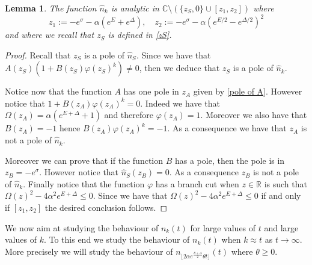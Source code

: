 \documentclass{article}
\numberwithin{equation}{section}
\theoremstyle{plain}
\newtheorem{lemma}[theorem]{Lemma}
\begin{document}
\begin{lemma}
    The function $\hat{n}_k$ is analytic in $\mathbb C \setminus \left(  \{ z_S, 0  \} \cup [z_1, z_2 ] \right) $ where
    \begin{equation} \label{z_1 and z_2}
        z_1 := - e^\sigma - \alpha ( e^E + e^\Delta ), \quad  z_2:=  - e^\sigma - \alpha ( e^{E/2} - e^{\Delta/2} )^2
    \end{equation}
    and where we recall that $z_S $ is defined in \eqref{zS}. 
\end{lemma}
\begin{proof}
    Recall that $z_S$ is a pole of $\hat{n}_S $.
    Since we have that $A(z_S) \left( 1 + B(z_S) \varphi(z_S)^k  \right) \neq 0 $, then we deduce that $z_S $ is a pole of $\hat{n}_k$. 

    Notice now that the function $A$ has one pole in $z_A $ given by \eqref{pole of A}.
    However notice that $1 + B(z_A) \varphi(z_A)^k =0$. Indeed we have that 
    $\Omega (z_A)= \alpha (e^{E+\Delta} + 1 ) $ and therefore $\varphi(z_A)=1$. Moreover we also have that $B(z_A)=-1 $ hence $ B(z_A) \varphi(z_A)^k =-1 $.
    As a consequence we have that $z_A$ is not a pole of $\hat{n}_k$. 

    Moreover we can prove that if the function $B$ has a pole, then the pole is in $z_B= - e^\sigma $. However notice that $\hat{n}_S (z_B)=0$.
    As a consequence $z_B $ is not a pole of $\hat{n}_k$. 
    Finally notice that the function $\varphi$ has a branch cut when $z \in \mathbb R$ is such that $ \Omega(z)^2 - 4 \alpha^2 e^{E+ \Delta} \leq 0$. 
    Since we have that $ \Omega(z)^2 - 4 \alpha^2 e^{E+ \Delta} \leq 0$ if and only if $[z_1, z_2]$ the desired conclusion follows. 
\end{proof}

We now aim at studying the behaviour of $n_k(t) $ for large values of $t$ and large values of $k$. To this end we study the behaviour of $n_k(t)$ when $k \approx t $ as $t \rightarrow \infty$. More precisely we will study the behaviour of $n_{ \lfloor 2 \alpha e^{\frac{E+ \Delta}{2}} \theta t \rfloor } (t)$ where $\theta \geq 0$. 
\end{document}
